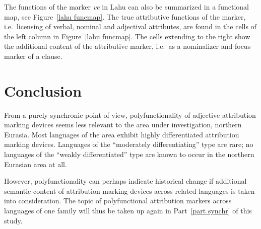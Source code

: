 The functions of the marker \textit{ve} in Lahu can also be summarized in a functional map, see Figure~\ref{lahu funcmap}. The true attributive functions of the marker, i.e.~licensing of verbal, nominal and adjectival attributes, are found in the cells of the left column in Figure~\ref{lahu funcmap}. The cells extending to the right show the additional content of the attributive marker, i.e.~as a nominalizer and focus marker of a clause.

\section{Conclusion}
From a purely synchronic point of view, polyfunctionality of adjective attribution marking devices seems less relevant to the area under investigation, northern Eurasia. Most languages of the area exhibit highly differentiated attribution marking devices. Languages of the “moderately differentiating” type are rare; no languages of the “weakly differentiated” type are known to occur in the northern Eurasian area at all.

However, polyfunctionality can perhaps indicate historical change if additional semantic content of attribution marking devices across related languages is taken into consideration. The topic of polyfunctional attribution markers across languages of one family will thus be taken up again in Part~\ref{part synchr} of this study.
